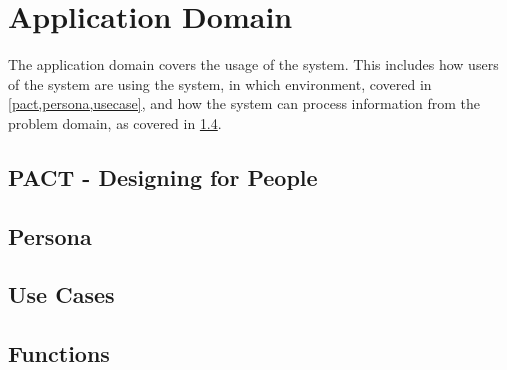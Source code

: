 \chapter{Application Domain}
The application domain covers the usage of the system. This includes
how users of the system are using the system, in which environment,
covered in \cref{pact,persona,usecase}, and how the system can process
information from the problem domain, as covered in \cref{functions}.


\section{PACT - Designing for People}\label{pact}


\section{Persona}\label{persona}


\section{Use Cases}\label{usecase}


\section{Functions}\label{functions}

